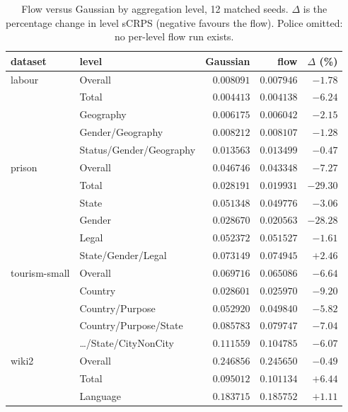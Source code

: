 \documentclass[11pt]{article}
\begin{document}
\begin{table}[t]
\centering
\caption{Flow versus Gaussian by aggregation level, 12 matched seeds. $\Delta$ is the
percentage change in level sCRPS (negative favours the flow). Police omitted: no
per-level flow run exists.}
\label{tab:levels}
\small
\begin{tabular}{llrrr}
\toprule
dataset & level & Gaussian & flow & $\Delta$ (\%) \\
\midrule
labour & Overall                  & $0.008091$ & $0.007946$ & $-1.78$ \\
       & Total                    & $0.004413$ & $0.004138$ & $-6.24$ \\
       & Geography                & $0.006175$ & $0.006042$ & $-2.15$ \\
       & Gender/Geography         & $0.008212$ & $0.008107$ & $-1.28$ \\
       & Status/Gender/Geography  & $0.013563$ & $0.013499$ & $-0.47$ \\
\midrule
prison & Overall                  & $0.046746$ & $0.043348$ & $-7.27$ \\
       & Total                    & $0.028191$ & $0.019931$ & $-29.30$ \\
       & State                    & $0.051348$ & $0.049776$ & $-3.06$ \\
       & Gender                   & $0.028670$ & $0.020563$ & $-28.28$ \\
       & Legal                    & $0.052372$ & $0.051527$ & $-1.61$ \\
       & State/Gender/Legal       & $0.073149$ & $0.074945$ & $+2.46$ \\
\midrule
tourism-small & Overall           & $0.069716$ & $0.065086$ & $-6.64$ \\
       & Country                  & $0.028601$ & $0.025970$ & $-9.20$ \\
       & Country/Purpose          & $0.052920$ & $0.049840$ & $-5.82$ \\
       & Country/Purpose/State    & $0.085783$ & $0.079747$ & $-7.04$ \\
       & \dots/State/CityNonCity  & $0.111559$ & $0.104785$ & $-6.07$ \\
\midrule
wiki2  & Overall                  & $0.246856$ & $0.245650$ & $-0.49$ \\
       & Total                    & $0.095012$ & $0.101134$ & $+6.44$ \\
       & Language                 & $0.183715$ & $0.185752$ & $+1.11$ \\

\end{tabular}
\end{table}
\end{document}
